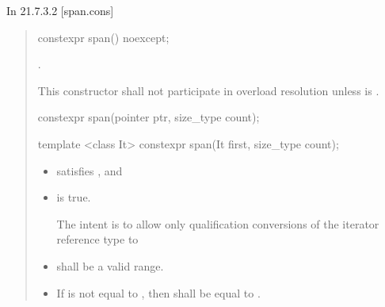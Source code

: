 \documentclass{wg21}
\begin{document}
In 21.7.3.2 [span.cons]

\begin{quote}


\begin{itemdecl}
    constexpr span() noexcept;
\end{itemdecl}
\begin{itemdescr}
    \pnum
    \ensures
    .

    \pnum
    \remarks
    This constructor shall not participate in overload resolution
    unless  is .
\end{itemdescr}
\begin{removedblock}
\begin{itemdecl}
constexpr span(pointer ptr, size_type count);
\end{itemdecl}
\end{removedblock}
\begin{addedblock}
\begin{itemdecl}
template <class It>
constexpr span(It first, size_type count);
\end{itemdecl}
\end{addedblock}
\begin{itemdescr}
    \begin{addedblock}
    \pnum
    \constraints
    \begin{itemize}
    	\item {} satisfies , and
    	\item {} is true.
    	 \begin{note}The intent is to allow only qualification conversions of the iterator reference type to  \end{note}
    \end{itemize}
    \end{addedblock}

    \expects
\begin{itemize}
    \item {} shall be a valid range.
    \item If  is not equal to ,
    then  shall be equal to .
\end{itemize}
    


\end{itemdescr}
\end{quote}
\end{document}
